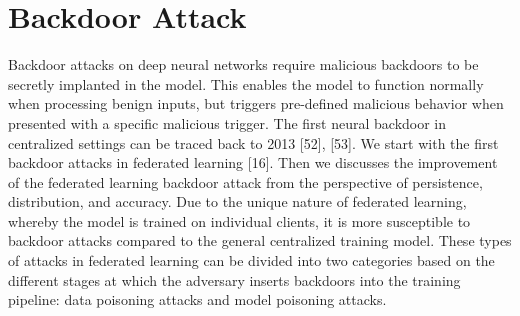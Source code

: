 \section{Backdoor Attack}  
Backdoor attacks on deep neural networks require
malicious backdoors to be secretly implanted in the model.
This enables the model to function normally when
processing benign inputs, but triggers pre-defined malicious
behavior when presented with a specific malicious trigger.
The first neural backdoor in centralized settings can be
traced back to 2013 [52], [53]. We start with the first
backdoor attacks in federated learning [16]. Then we discusses
the improvement of the federated learning backdoor attack
from the perspective of persistence, distribution, and
accuracy. Due to the unique nature of federated learning,
whereby the model is trained on individual clients, it is
more susceptible to backdoor attacks compared to the
general centralized training model. These types of attacks
in federated learning can be divided into two categories
based on the different stages at which the adversary
inserts backdoors into the training pipeline: data poisoning
attacks and model poisoning attacks. 


